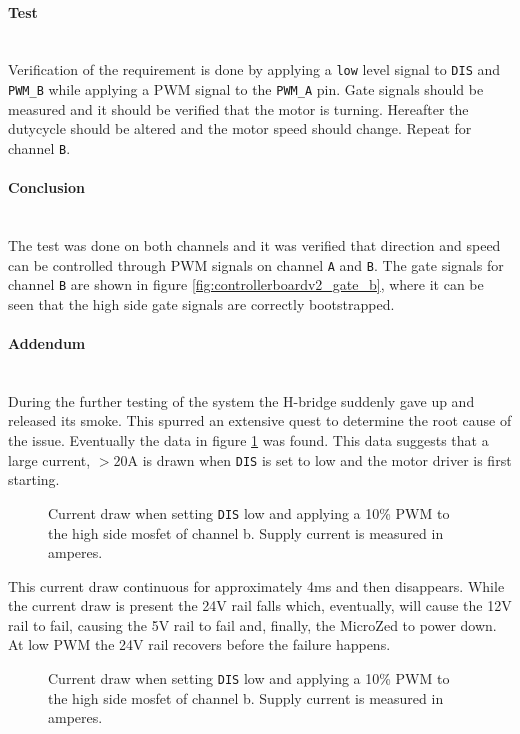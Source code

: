 \paragraph{Test}~\\
Verification of the requirement is done by applying a \texttt{low} level signal to \texttt{DIS} and \texttt{PWM\_B} while applying a PWM signal to the \texttt{PWM\_A} pin.
Gate signals should be measured and it should be verified that the motor is turning.
Hereafter the dutycycle should be altered and the motor speed should change.
Repeat for channel \texttt{B}.

\paragraph{Conclusion}~\\
The test was done on both channels and it was verified that direction and speed can be controlled through PWM signals on channel \texttt{A} and \texttt{B}.
The gate signals for channel \texttt{B} are shown in figure \ref{fig:controllerboardv2_gate_b}, where it can be seen that the high side gate signals are correctly bootstrapped.

\paragraph{Addendum}~\\
During the further testing of the system the H-bridge suddenly gave up and released its smoke.
This spurred an extensive quest to determine the root cause of the issue.
Eventually the data in figure \ref{fig:current_w_load} was found.
This data suggests that a large current, $>20$A is drawn when \texttt{DIS} is set to low and the motor driver is first starting.

\begin{figure}[h]
	\centering
	
	\caption{Current draw when setting \texttt{DIS} low and applying a 10\% PWM to the high side mosfet of channel b. Supply current is measured in amperes.}
	\label{fig:current_w_load}
\end{figure}

This current draw continuous for approximately 4ms and then disappears.
While the current draw is present the 24V rail falls which, eventually, will cause the 12V rail to fail, causing the 5V rail to fail and, finally, the MicroZed to power down.
At low PWM the 24V rail recovers before the failure happens.

\begin{figure}[h]
	\centering
	
	\caption{Current draw when setting \texttt{DIS} low and applying a 10\% PWM to the high side mosfet of channel b. Supply current is measured in amperes.}
	\label{fig:current_w_load_closeup}
\end{figure}

